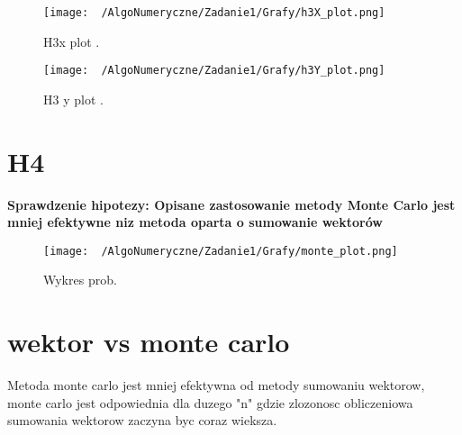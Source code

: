 \documentclass{article}
\begin{document}
\begin{figure}[t]
    \centering
    \texttt{[image: ~/AlgoNumeryczne/Zadanie1/Grafy/h3X\_plot.png]}
    \caption{H3x plot .}
    \label{fig:h2}
\end{figure}

\begin{figure}[t]
    \centering
    \texttt{[image: ~/AlgoNumeryczne/Zadanie1/Grafy/h3Y\_plot.png]}
    \caption{H3 y plot .}
    \label{fig:h2}
\end{figure}

\clearpage
\section{H4}

\textbf{Sprawdzenie hipotezy: Opisane zastosowanie metody Monte Carlo jest mniej efektywne niz metoda oparta
o sumowanie wektorów }

\begin{figure}[htbp]
    \centering
    \texttt{[image: ~/AlgoNumeryczne/Zadanie1/Grafy/monte\_plot.png]}
    \caption{Wykres prob.}
    \label{fig:h4}
\end{figure}


\section{wektor vs monte carlo}

\text Metoda monte carlo jest mniej efektywna od metody sumowaniu wektorow, monte carlo jest odpowiednia dla duzego "n" gdzie zlozonosc obliczeniowa sumowania wektorow zaczyna byc coraz wieksza.
\end{document}
